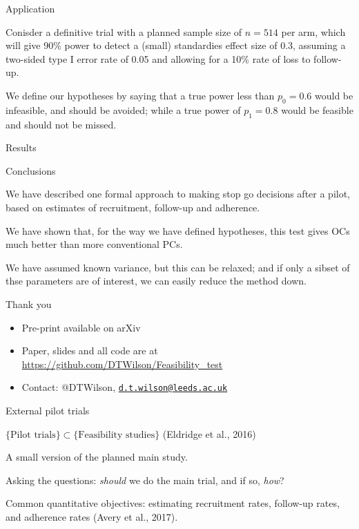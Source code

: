 \documentclass[
  ignorenonframetext,
]{beamer}
\providecommand{\tightlist}{%
  \setlength{\itemsep}{0pt}\setlength{\parskip}{0pt}}
\begin{document}
\begin{frame}{Application}
\protect\hypertarget{application}{}

Conisder a definitive trial with a planned sample size of \(n = 514\)
per arm, which will give 90\% power to detect a (small) standardies
effect size of 0.3, assuming a two-sided type I error rate of 0.05 and
allowing for a 10\% rate of loss to follow-up.

We define our hypotheses by saying that a true power less than
\(p_0 = 0.6\) would be infeasible, and should be avoided; while a true
power of \(p_1 = 0.8\) would be feasible and should not be missed.

\end{frame}

\begin{frame}{Results}
\protect\hypertarget{results}{}

\end{frame}

\begin{frame}{Conclusions}
\protect\hypertarget{conclusions}{}

We have described one formal approach to making stop go decisions after
a pilot, based on estimates of recruitment, follow-up and adherence.

We have shown that, for the way we have defined hypotheses, this test
gives OCs much better than more conventional PCs.

We have assumed known variance, but this can be relaxed; and if only a
sibset of thse parameters are of interest, we can easily reduce the
method down.

\end{frame}

\begin{frame}

Thank you

\begin{itemize}
\tightlist
\item
  Pre-print available on arXiv
\item
  Paper, slides and all code are at
  \url{https://github.com/DTWilson/Feasibility_test}
\item
  Contact: @DTWilson,
  \href{mailto:d.t.wilson@leeds.ac.uk}{\nolinkurl{d.t.wilson@leeds.ac.uk}}
\end{itemize}

\end{frame}

\begin{frame}{External pilot trials}
\protect\hypertarget{external-pilot-trials}{}

\(\{\text{Pilot trials}\} \subset \{\text{Feasibility studies}\}\)
(Eldridge et al., 2016)

A small version of the planned main study.

Asking the questions: \emph{should} we do the main trial, and if so,
\emph{how}?

Common quantitative objectives: estimating recruitment rates, follow-up
rates, and adherence rates (Avery et al., 2017).

\end{frame}
\end{document}
